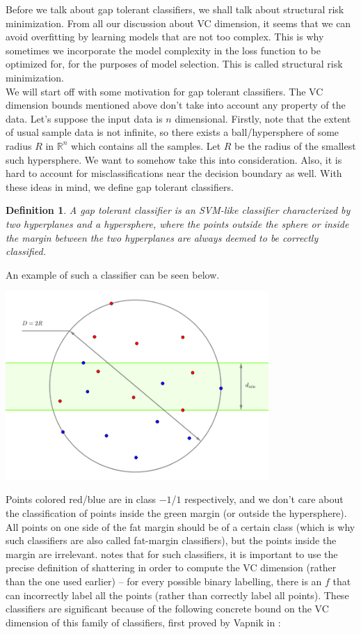 \documentclass[11pt]{article}
\newcommand{\nl}{\vspace*{0.3cm}\\}
\newtheorem{definition}{Definition}[section]
\begin{document}
Before we talk about gap tolerant classifiers, we shall talk about structural risk minimization. From all our discussion about VC dimension, it seems that we can avoid overfitting by learning
models that are not too complex. This is why sometimes we incorporate the model complexity in the loss function to be optimized for, for the purposes of model selection. This is called
structural risk minimization.\nl
We will start off with some motivation for gap tolerant classifiers. The VC dimension bounds mentioned above don't take into account any property of the data. Let's suppose the input data is $n$ dimensional. Firstly, note that the extent of usual sample data is not infinite, so there exists a
ball/hypersphere of some radius $R$ in $\mathbb{R}^n$ which contains all the samples. Let $R$ be the radius of the smallest such hypersphere. We want to somehow take this into consideration. Also, it
is hard to account for misclassifications near the decision boundary as well. With these ideas in mind, we define gap tolerant classifiers.
\begin{definition}
    A gap tolerant classifier is an SVM-like classifier characterized by two hyperplanes and a hypersphere, where the points outside the sphere or inside the margin between the two hyperplanes are always
    deemed to be correctly classified.
\end{definition}
An example of such a classifier can be seen below.

\begin{center}
\includegraphics[width=0.75\textwidth]{gap-tolerant-classifier.png}
\end{center}
Points colored red/blue are in class $-1$/$1$ respectively, and we don't care about the classification of points inside the green margin (or outside the hypersphere). All points on one side of the
fat margin should be of a certain class (which is why such classifiers are also called fat-margin classifiers), but the points inside the margin are irrelevant. \cite{burges} notes that for
such classifiers, it is important to use the precise definition of shattering in order to compute the VC dimension (rather than the one used earlier) -- for every possible binary labelling, there is an $f$ that can incorrectly label all
the points (rather than correctly label all points). These classifiers are significant because of the following concrete bound on the VC dimension of this family of classifiers, first
proved by Vapnik in \cite{vapnik2}:
\end{document}
